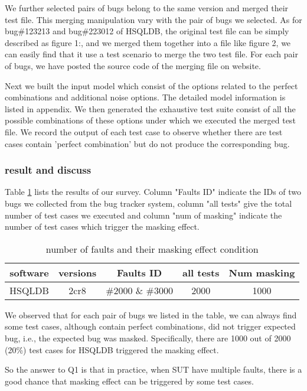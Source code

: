 \documentclass{sig-alternate}
\begin{document}
We further selected pairs of bugs belong to the same version and merged their test file. This merging manipulation vary with the pair of bugs we selected. As for bug\#123213 and  bug\#223012 of HSQLDB, the original test file can be simply described as figure 1:, and we merged them together into a file like figure 2, we can easily find that it use a test scenario to merge the two test file. For each pair of bugs, we have posted the source code of the merging file on website.

Next we built the input model which consist of the options related to the perfect combinations and additional noise options. The detailed model information is listed in appendix. We then generated the exhaustive test suite consist of all the possible combinations of these options under which we executed the merged test file. We record the output of each test case to observe whether there are test cases contain 'perfect combination' but do not produce the corresponding bug.

\subsubsection{result and discuss}

Table \ref{masking effect condition} lists the results of our survey. Column "Faults ID" indicate the IDs of two bugs we collected from the bug tracker system, column "all tests" give the total number of test cases we executed and column "num of masking" indicate the number of test cases which trigger the masking effect.

\begin{table}\renewcommand{\arraystretch}{1.3}
\caption{number of faults and their masking effect condition}
\label{masking effect condition}
\begin{tabular}{c|c|c|c|c} \hline
software & versions & Faults ID  & all tests & Num masking\\ \hline
HSQLDB & 2cr8 & \#2000 \&  \#3000 & 2000 & 1000\\ \hline
\hline\end{tabular}
\end{table}

We observed that for each pair of bugs we listed in the table, we can always find some test cases, although contain perfect combinations, did not trigger expected bug, i.e., the expected bug was masked. Specifically, there are 1000 out of 2000 (20\%) test cases for HSQLDB triggered the masking effect.

So the answer to Q1 is that in practice, when SUT have multiple faults, there is a good chance that masking effect can be triggered by some test cases.
\end{document}
